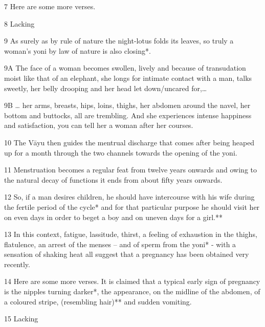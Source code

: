 \begin{translation}
\begin{tt}
\item[7]Here are some more verses.

\item[8] Lacking

\item[9]As surely as by rule of nature the night-lotus folds its leaves, so truly a 
woman’s yoni by law of nature is also closing*.

\item[9A]The face of a woman becomes swollen, lively and because of 
transudation moist like that of an elephant, she longs for intimate contact with a 
man, talks sweetly, her belly drooping and her head let down/uncared for,…

\item[9B]… her arms, breasts, hips, loins, thighs, her abdomen around the navel, 
her bottom and buttocks, all are trembling. And she experiences intense 
happiness and satisfaction, you can tell her a woman after her courses. 

\item[10]The Vāyu then guides the mentrual discharge that comes after being 
heaped up for a month through the two channels towards the opening of the yoni.

\item[11]Menstruation becomes a regular feat from twelve years onwards and 
owing to the natural decay of functions it ends from about fifty years onwards.

\item[12]So, if a man desires children, he should have intercourse with his wife 
during the fertile period of the cycle* and for that particular purpose he should 
visit her on even days in order to beget a boy and on uneven days for a girl.**

\item[13]In this context, fatigue, lassitude, thirst, a feeling of exhaustion in the 
thighs, flatulence, an arrest of the menses – and of sperm from the yoni* - with a 
sensation of shaking heat all suggest that a pregnancy has been obtained very 
recently.

\item[14]Here are some more verses. It is claimed that a typical early sign of 
pregnancy is the nipples turning darker*, the appearance, on the midline of the 
abdomen, of a coloured stripe, (resembling hair)** and sudden vomiting.

\item[15] Lacking


\end{tt}
\end{translation}
